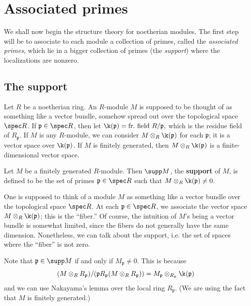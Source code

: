 \section{Associated primes}

We shall now begin the structure theory for noetherian modules. The first step
will be to associate to each module a collection of primes, called the
\emph{associated primes}, which lie in a bigger collection of primes (the
\emph{support}) where the
localizations are nonzero.

\subsection{The support}
 Let $R$ be a  noetherian ring.  An $R$-module $M$ is supposed to be thought
 of as something like a vector bundle, somehow
spread out over the topological space $\spec R$. If $\mathfrak{p} \in \spec R$, then  let
\( \k(\mathfrak{p}) = \mathrm{fr.  \ field \ } R/\mathfrak{p}  ,\)
which is the residue field of $R_{\mathfrak{p}}$. If $M$ is any $R$-module, we
can consider $M \otimes_R \k(\mathfrak{p})$ for each $\mathfrak{p}$; it is a
vector space over $\k(\mathfrak{p})$. If $M$ is finitely generated, then $M \otimes_R
\k(\mathfrak{p})$ is a finite-dimensional vector space.

\begin{definition} 
Let $M$ be a finitely generated $R$-module. Then $\supp M$, the
\textbf{support} of $M$,  is defined to be the set of primes
$\mathfrak{p} \in \spec R$ such that
\( M \otimes_R \k(\mathfrak{p}) \neq 0.  \)
\end{definition} 

One is  supposed to think of a module $M$ as something like a vector bundle
over the topological space
$\spec R$. At each $\mathfrak{p} \in \spec R$, we associate the vector space $M
\otimes_R \k(\mathfrak{p})$; this is the ``fiber.'' Of course, the intuition
of  $M$'s being a vector bundle is somewhat limited, since the fibers
do not generally have  the same dimension.
Nonetheless, we can talk about the support, i.e. the set of spaces where the
``fiber'' is not zero.

Note that $\mathfrak{p} \in \supp M$ if and only if $M_{\mathfrak{p}} \neq 0$. This is
because
\[ (M \otimes_R R_{\mathfrak{p}})/( \mathfrak{p} R_{\mathfrak{p}} (M \otimes_R
R_{\mathfrak{p}}))  = M_{\mathfrak{p}}
\otimes_{R_{\mathfrak{p}}} \k(\mathfrak{p})  \]
and we can use Nakayama's lemma over the local ring $R_{\mathfrak{p}}$.  (We
are using the fact that $M$ is finitely generated.)

